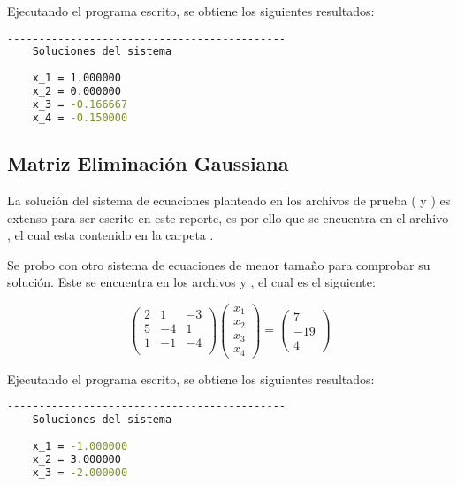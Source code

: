Ejecutando el programa escrito, se obtiene los siguientes resultados:

\begin{lstlisting}[language=bash]
    --------------------------------------------
    Soluciones del sistema
    
    x_1	= 1.000000
    x_2	= 0.000000
    x_3	= -0.166667
    x_4	= -0.150000

\end{lstlisting}

\subsection{Matriz Eliminación Gaussiana}


La solución del sistema de ecuaciones planteado en los archivos de prueba ( y ) es extenso para ser escrito en este reporte, es por ello que se encuentra en el archivo , el cual esta contenido en la carpeta .

Se probo con otro sistema de ecuaciones de menor tamaño para comprobar su solución. Este se encuentra en los archivos  y , el cual es el siguiente:

\begin{equation*}
    \begin{pmatrix}
        2 & 1  & -3 \\
        5 & -4 & 1  \\
        1 & -1 & -4 \\
    \end{pmatrix}
    \begin{pmatrix}
        x_1 \\
        x_2 \\
        x_3 \\
        x_4
    \end{pmatrix} = \begin{pmatrix}
        7   \\
        -19 \\
        4
    \end{pmatrix}
\end{equation*}

Ejecutando el programa escrito, se obtiene los siguientes resultados:

\begin{lstlisting}[language=bash]
    --------------------------------------------
    Soluciones del sistema
    
    x_1	= -1.000000
    x_2	= 3.000000
    x_3	= -2.000000    

\end{lstlisting}